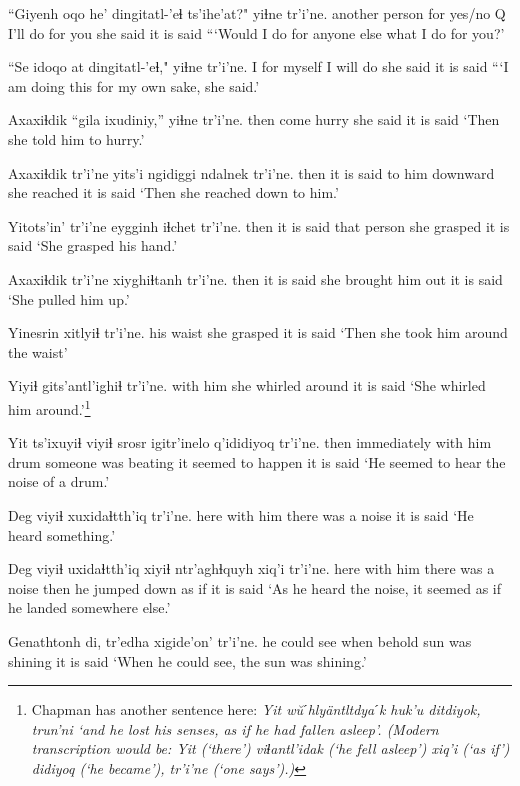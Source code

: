 \documentclass[12pt]{article}
\begin{document}
\gll ``Giyenh oqo he' dingitatl-'eɬ ts'ihe'at?" yiɬne  tr'i'ne.
{another person} for {yes/no Q} {I'll do for you} {} {she said} {it is said}
\glt ```Would I do for anyone else what I do for you?'
\glend

\gll ``Se idoqo  at dingitatl-'eɬ," yiɬne  tr'i'ne.
I {for myself} {} {I will do} {she said} {it is said}
\glt ```I am doing this for my own sake, she said.'
\glend

\gll Axaxiɬdik ``gila ixudiniy,'' yiɬne  tr'i'ne.
then  come hurry  {she said} {it is said}
\glt `Then she told him to hurry.'
\glend

\gll Axaxiɬdik tr'i'ne yits'i ngidiggi ndalnek tr'i'ne.
then  {it is said} {to him} downward {she reached} {it is said}
\glt `Then she reached down to him.'
\glend

\gll Yitots'in' tr'i'ne eygginh iɬchet  tr'i'ne.
then  {it is said} {that person} {she grasped} {it is said}
\glt `She grasped his hand.'
\glend

\gll Axaxiɬdik tr'i'ne xiyghiɬtanh tr'i'ne.
then  {it is said} {she brought him out} {it is said}
\glt `She pulled him up.'
\glend

\gll Yinesrin xitlyiɬ  tr'i'ne.
{his waist} {she grasped} {it is said}
\glt `Then she took him around the waist'
\glend

\gll Yiyiɬ  gits'antl'ighiɬ tr'i'ne.
{with him} {she whirled around} {it is said}
\glt `She whirled him around.'\footnote{Chapman has another sentence here: \em Yit w\u{u}ˊhly\"antltdyaˊk huk'u ditdiyok, trun'ni \em `and he lost his senses, as if he had fallen asleep'. (Modern transcription would be:  \em Yit \em (`there') \em viɬantl'idak \em (`he fell asleep') \em xiq'i \em (`as if') \em didiyoq \em (`he became'), \em tr'i'ne \em (`one says').) }
\glend

\gll Yit ts'ixuyiɬ viyiɬ  srosr igitr'inelo  q'ididiyoq  tr'i'ne. 
then immediately {with him} drum {someone was beating} {it seemed to happen} {it is said}
\glt `He seemed to hear the noise of a drum.'
\glend

\gll Deg viyiɬ  xuxidaɬtth'iq tr'i'ne.
 here {with him} {there was a noise} {it is said}
\glt `He heard something.'
\glend

\gll Deg viyiɬ  uxidaɬtth'iq xiyiɬ ntr'aghɬquyh xiq'i tr'i'ne.
here {with him} {there was a noise} then {he jumped down} {as if} {it is said}
\glt `As he heard the noise, it seemed as if he landed somewhere else.'
\glend

\gll Genathtonh di, tr'edha xigide'on'  tr'i'ne.
{he could see} when behold {sun was shining} {it is said}
\glt `When he could see, the sun was shining.'
\glend
\end{document}
